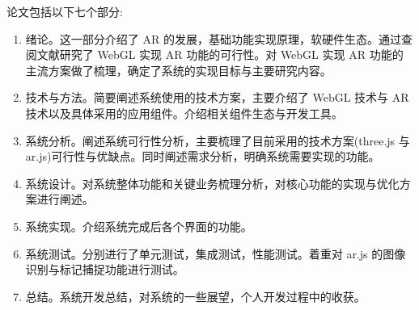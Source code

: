 论文包括以下七个部分:
\begin{enumerate}
  \item 绪论。这一部分介绍了 AR 的发展，基础功能实现原理，软硬件生态。通过查阅文献研究了 WebGL 实现 AR 功能的可行性。对 WebGL 实现 AR 功能的主流方案做了梳理，确定了系统的实现目标与主要研究内容。
  \item 技术与方法。简要阐述系统使用的技术方案，主要介绍了 WebGL 技术与 AR 技术以及具体采用的应用组件。介绍相关组件生态与开发工具。
  \item 系统分析。阐述系统可行性分析，主要梳理了目前采用的技术方案(three.js 与 ar.js)可行性与优缺点。同时阐述需求分析，明确系统需要实现的功能。
  \item 系统设计。对系统整体功能和关键业务梳理分析，对核心功能的实现与优化方案进行阐述。
  \item 系统实现。介绍系统完成后各个界面的功能。
  \item 系统测试。分别进行了单元测试，集成测试，性能测试。着重对 ar.js 的图像识别与标记捕捉功能进行测试。
  \item 总结。系统开发总结，对系统的一些展望，个人开发过程中的收获。
\end{enumerate}